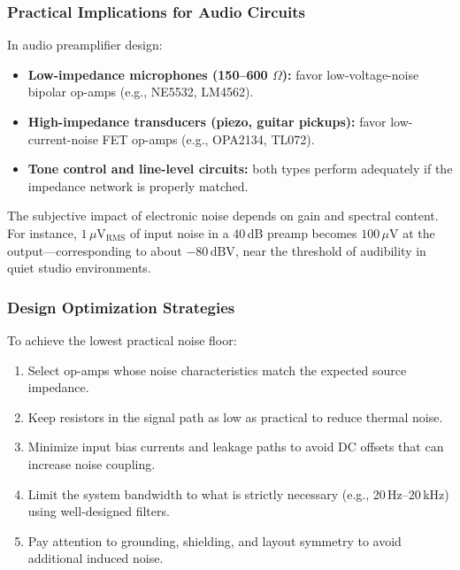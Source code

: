 \subsubsection{Practical Implications for Audio Circuits}
In audio preamplifier design:
\begin{itemize}
  \item \textbf{Low-impedance microphones (150–600 $\Omega$):} favor low-voltage-noise bipolar op-amps (e.g., NE5532, LM4562).
  \item \textbf{High-impedance transducers (piezo, guitar pickups):} favor low-current-noise FET op-amps (e.g., OPA2134, TL072).
  \item \textbf{Tone control and line-level circuits:} both types perform adequately if the impedance network is properly matched.
\end{itemize}

The subjective impact of electronic noise depends on gain and spectral content.  
For instance, $1\,\mu\text{V}_{\mathrm{RMS}}$ of input noise in a 40\,dB preamp becomes $100\,\mu\text{V}$ at the output—corresponding to about $-80\,\text{dBV}$, near the threshold of audibility in quiet studio environments.

\subsubsection{Design Optimization Strategies}
To achieve the lowest practical noise floor:
\begin{enumerate}
  \item Select op-amps whose noise characteristics match the expected source impedance.
  \item Keep resistors in the signal path as low as practical to reduce thermal noise.
  \item Minimize input bias currents and leakage paths to avoid DC offsets that can increase noise coupling.
  \item Limit the system bandwidth to what is strictly necessary (e.g., 20\,Hz–20\,kHz) using well-designed filters.
  \item Pay attention to grounding, shielding, and layout symmetry to avoid additional induced noise.
\end{enumerate}


